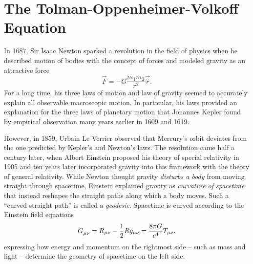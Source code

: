 \chapter{The Tolman-Oppenheimer-Volkoff Equation}
\label{chap:tov}

In 1687, Sir Isaac Newton sparked a revolution in the field of physics when he described motion of bodies with the concept of forces and modeled gravity as an attractive force
\cite{ref:newton}
\begin{equation*}
	\vec{F} = - G \frac{m_1 m_2}{r^2} \vec{\hat{r}} .
\end{equation*}
For a long time, his three laws of motion and law of gravity seemed to accurately explain all observable macroscopic motion.
In particular, his laws provided an explanation for the three laws of planetary motion that Johannes Kepler found by empirical observation many years earlier in 1609 and 1619. \cite{ref:kepler1,ref:kepler2} 

However, in 1859, Urbain Le Verrier observed that Mercury's orbit deviates from the one predicted by Kepler's and Newton's laws. \cite{ref:le_verrier}
The resolution came half a century later, when Albert Einstein proposed his theory of special relativity in 1905 and ten years later incorporated gravity into this framework with the theory of general relativity. \cite{ref:einstein_special,ref:einstein_general}
While Newton thought gravity \emph{disturbs a body} from moving straight through spacetime, Einstein explained gravity as \emph{curvature of spacetime} that instead reshapes the straight paths along which a body moves.
Such a ``curved straight path'' is called a \emph{geodesic}.
Spacetime is curved according to the Einstein field equations
\begin{equation*}
	G\indices{_\mu_\nu} = R_{\mu \nu} - \frac{1}{2} R g_{\mu \nu} = \frac{8 \pi G}{c^4} T_{\mu \nu} ,
\end{equation*}
expressing how energy and momentum on the rightmost side -- such as mass and light -- determine the geometry of spacetime on the left side.

